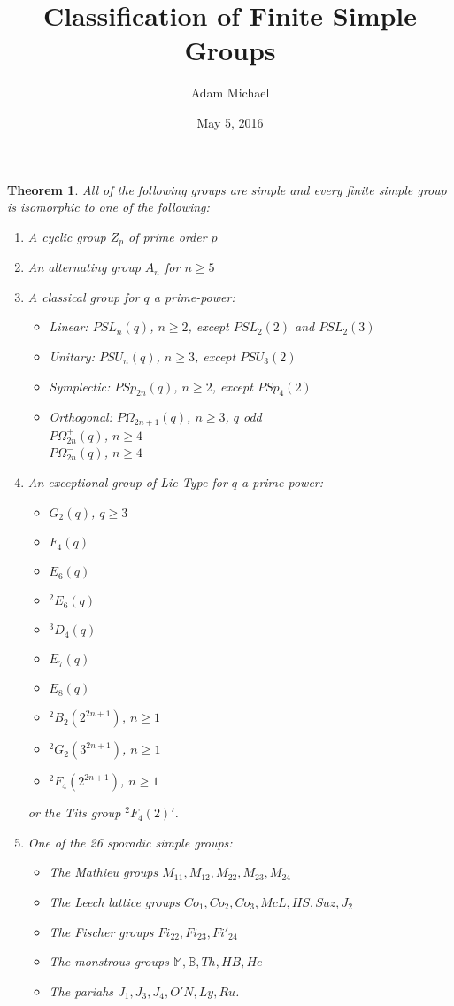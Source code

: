 \documentclass[a4paper]{article}
\title{Classification of Finite Simple Groups}
\author{Adam Michael}
\date{May 5, 2016}
\begin{document}
\maketitle

\newtheorem{theorem}{Theorem}
\newtheorem{lemma}{Lemma}
\newtheorem{definition}{Definition}

\begin{theorem}
All of the following groups are simple and every finite simple group is isomorphic to one of the following:
\begin{enumerate}
	\item
	A cyclic group $Z_p$ of prime order $p$
	\item
	An alternating group $A_n$ for $n \ge 5$
	\item
	A classical group for $q$ a prime-power:
	\begin{itemize}
		\item
		Linear: $PSL_n(q)$, $n \ge 2$, except $PSL_2(2)$ and $PSL_2(3)$
		\item
		Unitary: $PSU_n(q)$, $n \ge 3$, except $PSU_3(2)$
		\item
		Symplectic: $PSp_{2n}(q)$, $n \ge 2$, except $PSp_4(2)$
		\item
		Orthogonal: $P\Omega_{2n+1}(q)$, $n \ge 3$, $q$ odd\\
		$P\Omega^+_{2n}(q)$, $n \ge 4$\\
		$P\Omega^-_{2n}(q)$, $n \ge 4$
	\end{itemize}
	\item
	An exceptional group of Lie Type for $q$ a prime-power:
	\begin{itemize}
		\item $G_2(q)$, $q \ge 3$
		\item $F_4(q)$
		\item $E_6(q)$
		\item ${}^2E_6(q)$
		\item ${}^3D_4(q)$
		\item $E_7(q)$
		\item $E_8(q)$
		\item ${}^2B_2(2^{2n+1})$, $n \ge 1$
		\item ${}^2G_2(3^{2n+1})$, $n \ge 1$
		\item ${}^2F_4(2^{2n+1})$, $n \ge 1$
	\end{itemize}
	or the Tits group ${}^2F_4(2)'$.
	\item
	One of the 26 sporadic simple groups:
	\begin{itemize}
		\item
		The Mathieu groups $M_{11}, M_{12}, M_{22}, M_{23}, M_{24}$
		\item
		The Leech lattice groups $Co_1, Co_2, Co_3, McL, HS, Suz, J_2$
		\item
		The Fischer groups $Fi_{22}, Fi_{23}, Fi'_{24}$
		\item
		The monstrous groups $\mathbb{M}, \mathbb{B}, Th, HB, He$
		\item
		The pariahs $J_1, J_3, J_4, O'N, Ly, Ru$.
	\end{itemize}
\end{enumerate}
\end{theorem}
\end{document}
